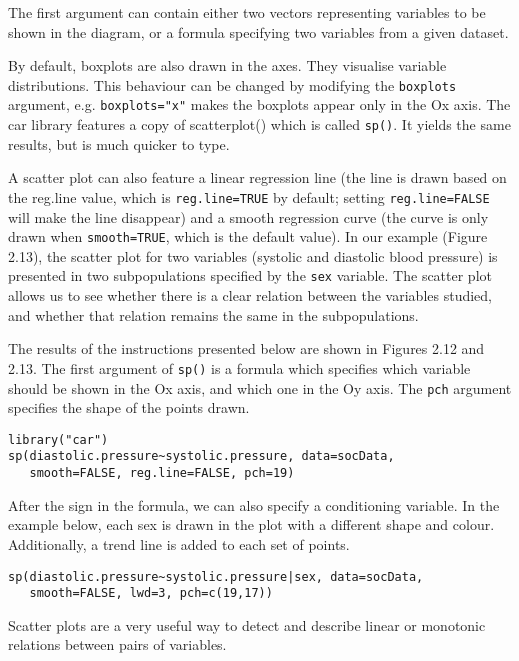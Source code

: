 \documentclass[]{book}
\theoremstyle{definition}
\theoremstyle{definition}
\theoremstyle{definition}
\theoremstyle{remark}
\begin{document}
The first argument can contain either two vectors representing variables
to be shown in the diagram, or a formula specifying two variables from a
given dataset.

By default, boxplots are also drawn in the axes. They visualise variable
distributions. This behaviour can be changed by modifying the
\texttt{boxplots} argument, e.g. \texttt{boxplots="x"} makes the
boxplots appear only in the Ox axis. The car library features a copy of
scatterplot() which is called \texttt{sp()}. It yields the same results,
but is much quicker to type.

A scatter plot can also feature a linear regression line (the line is
drawn based on the reg.line value, which is \texttt{reg.line=TRUE} by
default; setting \texttt{reg.line=FALSE} will make the line disappear)
and a smooth regression curve (the curve is only drawn when
\texttt{smooth=TRUE}, which is the default value). In our example
(Figure 2.13), the scatter plot for two variables (systolic and
diastolic blood pressure) is presented in two subpopulations specified
by the \texttt{sex} variable. The scatter plot allows us to see whether
there is a clear relation between the variables studied, and whether
that relation remains the same in the subpopulations.

The results of the instructions presented below are shown in Figures
2.12 and 2.13. The first argument of \texttt{sp()} is a formula which
specifies which variable should be shown in the Ox axis, and which one
in the Oy axis. The \texttt{pch} argument specifies the shape of the
points drawn.

\begin{verbatim}
library("car")
sp(diastolic.pressure~systolic.pressure, data=socData,
   smooth=FALSE, reg.line=FALSE, pch=19)
\end{verbatim}

After the \textbar{} sign in the formula, we can also specify a
conditioning variable. In the example below, each sex is drawn in the
plot with a different shape and colour. Additionally, a trend line is
added to each set of points.

\begin{verbatim}
sp(diastolic.pressure~systolic.pressure|sex, data=socData,
   smooth=FALSE, lwd=3, pch=c(19,17))
\end{verbatim}

Scatter plots are a very useful way to detect and describe linear or
monotonic relations between pairs of variables.
\end{document}
